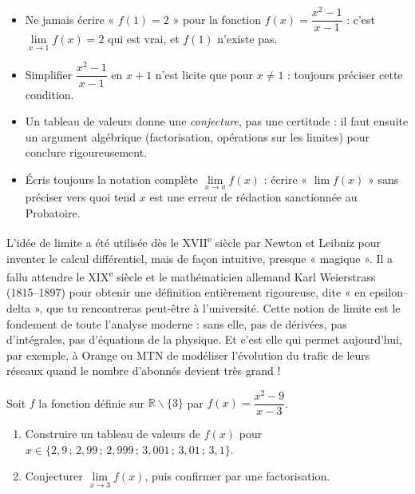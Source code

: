 \documentclass[11pt]{article}
\def\setminus{\mathbin{\backslash}}\let\smallsetminus\setminus
\begin{document}
\begin{attention}
\begin{itemize}
\item Ne jamais écrire « $f(1)=2$ » pour la fonction $f(x)=\dfrac{x^{2}-1}{x-1}$ : c'est $\lim\limits_{x\to1}f(x)=2$ qui est vrai, et $f(1)$ n'existe pas.
\item Simplifier $\dfrac{x^{2}-1}{x-1}$ en $x+1$ n'est licite que pour $x\neq 1$ : toujours préciser cette condition.
\item Un tableau de valeurs donne une \emph{conjecture}, pas une certitude : il faut ensuite un argument algébrique (factorisation, opérations sur les limites) pour conclure rigoureusement.
\item Écris toujours la notation complète $\lim\limits_{x\to a}f(x)$ : écrire « $\lim f(x)$ » sans préciser vers quoi tend $x$ est une erreur de rédaction sanctionnée au Probatoire.
\end{itemize}
\end{attention}

\begin{savaistu}
L'idée de limite a été utilisée dès le XVII\textsuperscript{e} siècle par Newton et Leibniz pour inventer le calcul différentiel, mais de façon intuitive, presque « magique ». Il a fallu attendre le XIX\textsuperscript{e} siècle et le mathématicien allemand Karl Weierstrass (1815--1897) pour obtenir une définition entièrement rigoureuse, dite « en epsilon--delta », que tu rencontreras peut-être à l'université. Cette notion de limite est le fondement de toute l'analyse moderne : sans elle, pas de dérivées, pas d'intégrales, pas d'équations de la physique. Et c'est elle qui permet aujourd'hui, par exemple, à Orange ou MTN de modéliser l'évolution du trafic de leurs réseaux quand le nombre d'abonnés devient très grand !
\end{savaistu}

\begin{exercice}
Soit $f$ la fonction définie sur $\mathbb{R}\setminus\{3\}$ par $f(x)=\dfrac{x^{2}-9}{x-3}$.
\begin{enumerate}
\item Construire un tableau de valeurs de $f(x)$ pour $x\in\{2{,}9\,;\,2{,}99\,;\,2{,}999\,;\,3{,}001\,;\,3{,}01\,;\,3{,}1\}$.
\item Conjecturer $\lim\limits_{x\to3}f(x)$, puis confirmer par une factorisation.
\end{enumerate}
\end{exercice}
\end{document}
